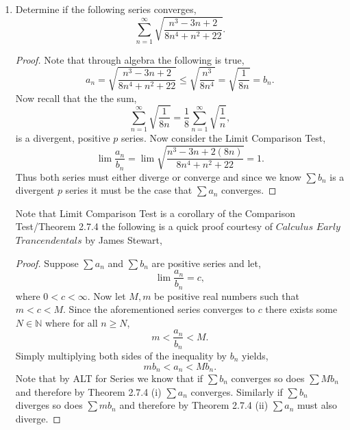 \documentclass[12pt]{article}
\makeatletter
\theoremstyle{homework}
\newenvironment{exercise}[1]
{\def\@currentlabel{#1}\exercisecore}
{\endexercisecore}
\newcommand{\Nats}{\ensuremath{\mathbb N}}
\makeatother
\begin{document}
\begin{exercise}{10}
\begin{enumerate}
      \item Determine if the following series converges,
      \begin{equation*}
        \sum_{n = 1}^{\infty}  \sqrt{\dfrac{n^3 - 3n + 2}{8n^4 + n^2 + 22}}.
      \end{equation*}
      \begin{proof}
        Note that through algebra the following is true,
        \begin{equation*}
         a_n =  \sqrt{\dfrac{n^3 - 3n + 2}{8n^4 + n^2 + 22}} \le \sqrt{\dfrac{n^3}{8n^4}} = \sqrt{\dfrac{1}{8n}} = b_n. 
        \end{equation*}
        Now recall that the the sum,
        \begin{equation*}
          \sum_{n = 1}^{\infty} \sqrt{\dfrac{1}{8n}} =\dfrac{1}{8} \sum_{n = 1}^{\infty} \sqrt{\dfrac{1}{n}},
        \end{equation*}
        is a divergent, positive $p$ series. Now consider the Limit Comparison Test,
        \begin{equation*}
          \lim \dfrac{a_n}{b_n} =   \lim \sqrt{\dfrac{n^3 - 3n + 2 (8n)}{8n^4 + n^2 + 22}} = 1.
         \end{equation*}
         Thus both series must either diverge or converge and since we know $\sum b_n$ is a divergent $p$ series it must be the case that $\sum a_n$ converges.
      \end{proof}

      Note that Limit Comparison Test is a corollary of the Comparison Test/Theorem 2.7.4 the following is a quick proof courtesy of  $Calculus$ $Early$ $Trancendentals$ by James Stewart,
      \begin{proof} Suppose $\sum a_n$ and $\sum b_n$ are positive series and let,
       \begin{equation*}
         \lim \dfrac{a_n}{b_n} = c,
       \end{equation*}
        where $0 < c < \infty$. Now let $M, m$ be positive real numbers such that $ m < c < M$. Since the aforementioned series converges to $c$ there exists some 
        $N \in \Nats$ where for all $n \geq N$,
        \begin{equation*}
          m < \dfrac{a_n}{b_n} < M.
        \end{equation*}
        Simply multiplying both sides of the inequality by $b_n$ yields,
        \begin{equation*}
         mb_n < a_n < Mb_n.
       \end{equation*}
       Note that by ALT for Series we know that if $\sum b_n$ converges so does $\sum Mb_n$ and therefore by Theorem 2.7.4 (i) $\sum a_n$ converges.
       Similarly if $\sum b_n$ diverges so does $\sum mb_n$ and therefore by Theorem 2.7.4 (ii) $\sum a_n$ must also diverge.



      \end{proof}   



  \end{enumerate}
\end{exercise}
\end{document}
